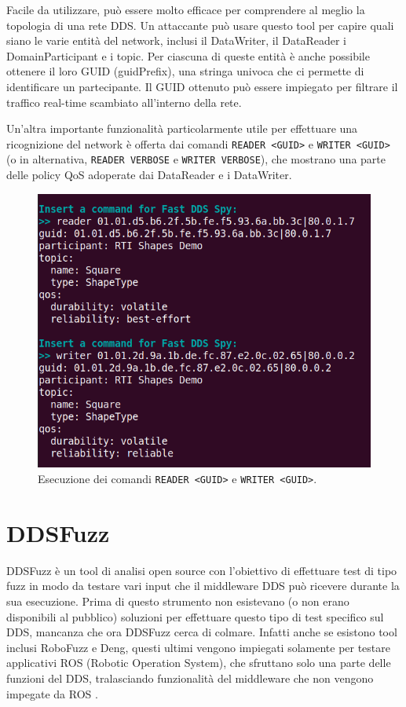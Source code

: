 Facile da utilizzare, può essere molto efficace per comprendere 
al meglio la topologia di una rete DDS. Un attaccante può usare questo 
tool per capire quali siano le varie entità del network, 
inclusi il DataWriter, il DataReader i DomainParticipant e i topic.
Per ciascuna di queste entità è anche possibile ottenere 
il loro GUID (guidPrefix), 
una stringa univoca che ci permette di identificare un partecipante.
Il GUID ottenuto può essere impiegato 
per filtrare il traffico 
real-time scambiato
all'interno della rete.

Un'altra importante funzionalità particolarmente utile per effettuare
una ricognizione del
network è offerta dai
comandi \texttt{READER <GUID>} e \texttt{WRITER <GUID>} (o in alternativa,
\texttt{READER VERBOSE} e \texttt{WRITER VERBOSE}), che mostrano
una parte delle policy QoS adoperate dai DataReader e i DataWriter.

\begin{figure}[H]
    \centering
    \includegraphics[width=12cm, keepaspectratio]{img/fastddsspyQoS.png}
    \caption{Esecuzione dei comandi \texttt{READER <GUID>} 
    e \texttt{WRITER <GUID>}.}
    \label{fastddsspyQoS}
\end{figure}

\section{DDSFuzz}
DDSFuzz è un tool di analisi open source con l'obiettivo di 
effettuare test di tipo fuzz
in modo da testare vari input che il middleware DDS può
ricevere durante la sua esecuzione. Prima di questo strumento 
non esistevano (o non erano disponibili al pubblico) soluzioni
per effettuare questo tipo di test specifico sul DDS, mancanza
che ora DDSFuzz cerca di colmare. Infatti anche se esistono tool 
inclusi RoboFuzz e Deng, questi ultimi vengono impiegati solamente
per testare applicativi ROS (Robotic Operation System), che 
sfruttano solo una parte delle funzioni del DDS, tralasciando
funzionalità del middleware che non vengono impegate
da ROS \cite{10.1145/3691620.3695073}.\label{ddsfuzz}

